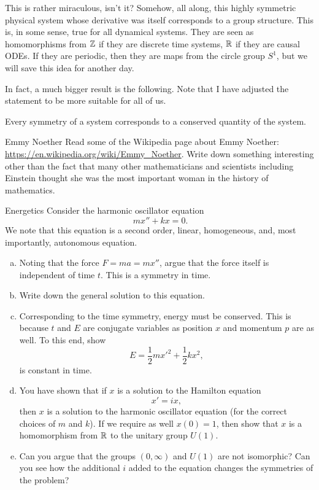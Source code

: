 \documentclass{article}
\theoremstyle{indented}
\begin{document}
This is rather miraculous, isn't it? Somehow, all along, this highly symmetric physical system whose derivative was itself corresponds to a group structure. This is, in some sense, true for all dynamical systems. They are seen as homomorphisms from $\mathbb{Z}$ if they are discrete time systems, $\mathbb{R}$ if they are causal ODEs. If they are periodic, then they are maps from the circle group $S^1$, but we will save this idea for another day.

In fact, a much bigger result is the following. Note that I have adjusted the statement to be more suitable for all of us.

\begin{theorem}
Every symmetry of a system corresponds to a conserved quantity of the system.
\end{theorem}

\begin{problem}{Emmy Noether}{}
Read some of the Wikipedia page about Emmy Noether: \url{https://en.wikipedia.org/wiki/Emmy_Noether}. Write down something interesting other than the fact that many other mathematicians and scientists including Einstein thought she was the most important woman in the history of mathematics.
\end{problem}

\begin{problem}{Energetics}{}
Consider the harmonic oscillator equation
\[\
mx'' + k x = 0.
\]
We note that this equation is a second order, linear, homogeneous, and, most importantly, autonomous equation.
\begin{enumerate}[(a)]
    \item Noting that the force $F=ma=mx''$, argue that the force itself is independent of time $t$. This is a symmetry in time.
    \item Write down the general solution to this equation.
    \item Corresponding to the time symmetry, energy must be conserved. This is because $t$ and $E$ are conjugate variables as position $x$ and momentum $p$ are as well. To this end, show
    \[
    E = \frac{1}{2}mx'^2 + \frac{1}{2}kx^2,
    \]
    is constant in time.
    \item You have shown that if $x$ is a solution to the Hamilton equation
    \[
    x'=ix,
    \]
    then $x$ is a solution to the harmonic oscillator equation (for the correct choices of $m$ and $k$). If we require as well $x(0)=1$, then show that $x$ is a homomorphism from $\mathbb{R}$ to the unitary group $U(1)$.
    \item Can you argue that the groups $(0,\infty)$ and $U(1)$ are not isomorphic? Can you see how the additional $i$ added to the equation changes the symmetries of the problem?
\end{enumerate}
\end{problem}
\end{document}
